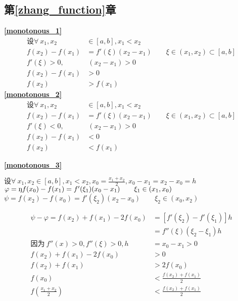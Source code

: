 \subsection{\centering 第\ref{zhang_function}章}
\textbf{\large \ref{monotonous_1}}
\begin{displaymath}
    \begin{split}
        \mbox{设}\forall \ x_1,x_2&\in\left[a,b\right],x_1<x_2\\
        f(x_2)-f(x_1)&=f'(\xi)(x_2-x_1)\qquad \xi\in(x_1,x_2)\subset[a,b]\\
        f'(\xi)>0 ,&\ (x_2-x_1)>0\\
        f(x_2)-f(x_1)&>0\\
        f(x_2)&>f(x_1)
    \end{split}
\end{displaymath}
\textbf{\large \ref{monotonous_2}}
\begin{displaymath}
    \begin{split}
        \mbox{设}\forall\ x_1,x_2&\in\left[a,b\right],x_1<x_2\\
        f(x_2)-f(x_1)&=f'(\xi)(x_2-x_1)\qquad \xi\in(x_1,x_2)\subset[a,b]\\
        f'(\xi)<0 ,&\ (x_2-x_1)>0\\
        f(x_2)-f(x_1)&<0\\
        f(x_2)&<f(x_1)
    \end{split}
\end{displaymath}

\textbf{\large \ref{monotonous_3}}
\begin{center}
    $\mbox{设}\forall\  x_1,x_2\in\left[a,b\right],x_1<x_2,x_0=\frac{x_1+x_2}{2},x_0-x_1=x_2-x_0=h$\\
        $\varphi= \ding{173}f(x_0)-f(x_1)=f'(\xi_1)(x_0-x_1)\qquad \xi_1\in(x_1,x_0)$\\
        $\psi =f(x_2)-f(x_0)=f'(\xi_2)(x_2-x_0)\qquad \xi_2\in(x_0,x_2)$
\end{center}
\begin{displaymath}
    \begin{split}
        \psi-\varphi=f(x_2)+f(x_1)-2f(x_0)&=\left[f'(\xi_2)-f'(\xi_1)\right]h\\
         &=f''(\xi)(\xi_2-\xi_1)h\\
         \mbox{因为}\ f''(x)>0,f''(\xi)>0,h&=x_0-x_1>0\\
         f(x_2)+f(x_1)-2f(x_0)&>0\\
        f(x_2)+f(x_1)&>2f(x_0)\\
        f(x_0)&<\frac{f(x_2)+f(x_1)}{2}\\
        f(\frac{x_1+x_2}{2})&<\frac{f(x_2)+f(x_1)}{2}
    \end{split}
\end{displaymath}

